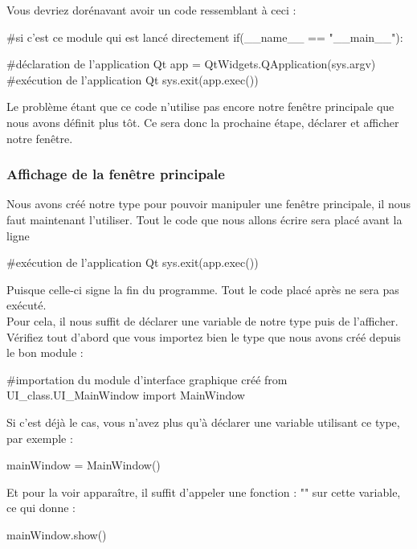 Vous devriez dorénavant avoir un code ressemblant à ceci :
\begin{Python}
#si c'est ce module qui est lancé directement
if(__name__ == "__main__"):

	#déclaration de l'application Qt
	app = QtWidgets.QApplication(sys.argv)
	#exécution de l'application Qt
	sys.exit(app.exec())
\end{Python}
Le problème étant que ce code n'utilise pas encore notre fenêtre principale que nous avons définit plus tôt.\newline
Ce sera donc la prochaine étape, déclarer et afficher notre fenêtre.

\subsubsection{Affichage de la fenêtre principale}

Nous avons créé notre type  pour pouvoir manipuler une fenêtre principale, il nous faut maintenant l'utiliser.\newline
Tout le code que nous allons écrire sera placé avant la ligne
\begin{Python}
    #exécution de l'application Qt
	sys.exit(app.exec())
\end{Python}
Puisque celle-ci signe la fin du programme. Tout le code placé après ne sera pas exécuté.\\

Pour cela, il nous suffit de déclarer une variable de notre type  puis de l'afficher.\newline
Vérifiez tout d'abord que vous importez bien le type que nous avons créé depuis le bon module :
\begin{Python}
#importation du module d'interface graphique créé
from UI_class.UI_MainWindow import MainWindow
\end{Python}
Si c'est déjà le cas, vous n'avez plus qu'à déclarer une variable utilisant ce type, par exemple :
\begin{Python}
mainWindow = MainWindow()
\end{Python}
Et pour la voir apparaître, il suffit d'appeler une fonction : "" sur cette variable, ce qui donne :
\begin{Python}
mainWindow.show()
\end{Python}



